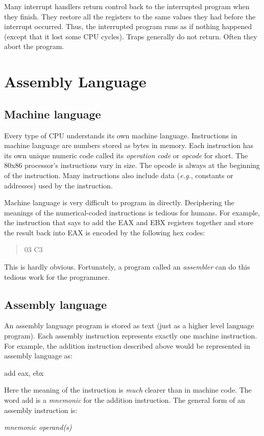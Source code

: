 Many interrupt handlers return control back to the interrupted program
when they finish. They restore all the registers to the same values
they had before the interrupt occurred. Thus, the interrupted program
runs as if nothing happened (except that it lost some CPU
cycles). Traps generally do not return. Often they abort the program.

\section{Assembly Language}

\subsection{Machine language}

Every type of CPU understands its own machine language. Instructions
in machine language are numbers stored as bytes in memory. Each
instruction has its own unique numeric code called its \emph{operation
code} or \emph{opcode}  for short. The 80x86 processor's
instructions vary in size.  The opcode is always at the beginning of
the instruction. Many instructions also include data ({\em e.g.\/},
constants or addresses) used by the instruction.

Machine language is very difficult to program in directly. Deciphering the
meanings of the numerical-coded instructions is tedious for humans. For
example, the instruction that says to add the EAX and EBX registers together
and store the result back into EAX is encoded by the following hex codes:
\begin{quote}
   03 C3
\end{quote}
This is hardly obvious. Fortunately, a program called an
\emph{assembler}  can do this tedious work for the
programmer.

\subsection{Assembly language}

An assembly language program is stored as text (just as a higher level language
program). Each assembly instruction represents exactly one machine instruction.
For example, the addition instruction described above would be represented
in assembly language as:
\begin{CodeQuote}
   add eax, ebx
\end{CodeQuote}
Here the meaning of the instruction is \emph{much} clearer than in
machine code. The word {\code add} is a \emph{mnemonic}
 for the addition instruction.  The general form of an
assembly instruction is:
\begin{CodeQuote}
  {\em mnemonic operand(s)}
\end{CodeQuote}

